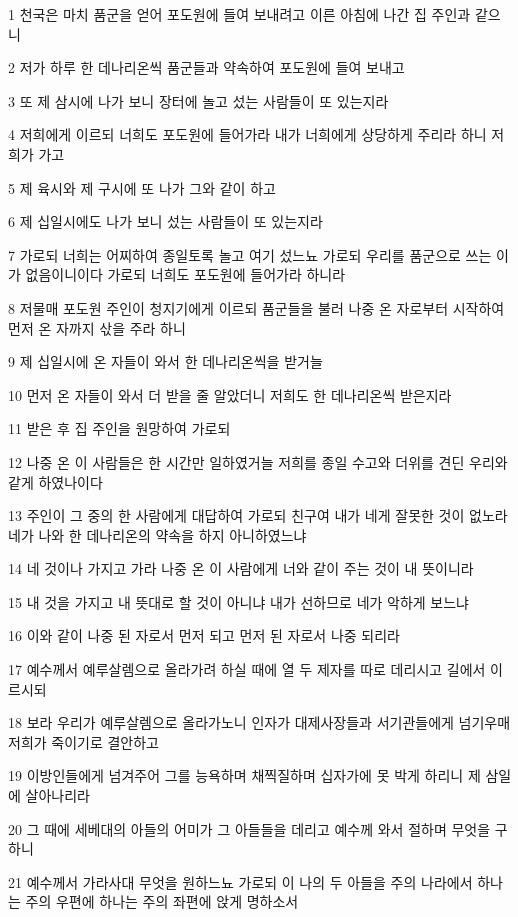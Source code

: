 \par 1 천국은 마치 품군을 얻어 포도원에 들여 보내려고 이른 아침에 나간 집 주인과 같으니
\par 2 저가 하루 한 데나리온씩 품군들과 약속하여 포도원에 들여 보내고
\par 3 또 제 삼시에 나가 보니 장터에 놀고 섰는 사람들이 또 있는지라
\par 4 저희에게 이르되 너희도 포도원에 들어가라 내가 너희에게 상당하게 주리라 하니 저희가 가고
\par 5 제 육시와 제 구시에 또 나가 그와 같이 하고
\par 6 제 십일시에도 나가 보니 섰는 사람들이 또 있는지라
\par 7 가로되 너희는 어찌하여 종일토록 놀고 여기 섰느뇨 가로되 우리를 품군으로 쓰는 이가 없음이니이다 가로되 너희도 포도원에 들어가라 하니라
\par 8 저물매 포도원 주인이 청지기에게 이르되 품군들을 불러 나중 온 자로부터 시작하여 먼저 온 자까지 삯을 주라 하니
\par 9 제 십일시에 온 자들이 와서 한 데나리온씩을 받거늘
\par 10 먼저 온 자들이 와서 더 받을 줄 알았더니 저희도 한 데나리온씩 받은지라
\par 11 받은 후 집 주인을 원망하여 가로되
\par 12 나중 온 이 사람들은 한 시간만 일하였거늘 저희를 종일 수고와 더위를 견딘 우리와 같게 하였나이다
\par 13 주인이 그 중의 한 사람에게 대답하여 가로되 친구여 내가 네게 잘못한 것이 없노라 네가 나와 한 데나리온의 약속을 하지 아니하였느냐
\par 14 네 것이나 가지고 가라 나중 온 이 사람에게 너와 같이 주는 것이 내 뜻이니라
\par 15 내 것을 가지고 내 뜻대로 할 것이 아니냐 내가 선하므로 네가 악하게 보느냐
\par 16 이와 같이 나중 된 자로서 먼저 되고 먼저 된 자로서 나중 되리라
\par 17 예수께서 예루살렘으로 올라가려 하실 때에 열 두 제자를 따로 데리시고 길에서 이르시되
\par 18 보라 우리가 예루살렘으로 올라가노니 인자가 대제사장들과 서기관들에게 넘기우매 저희가 죽이기로 결안하고
\par 19 이방인들에게 넘겨주어 그를 능욕하며 채찍질하며 십자가에 못 박게 하리니 제 삼일에 살아나리라
\par 20 그 때에 세베대의 아들의 어미가 그 아들들을 데리고 예수께 와서 절하며 무엇을 구하니
\par 21 예수께서 가라사대 무엇을 원하느뇨 가로되 이 나의 두 아들을 주의 나라에서 하나는 주의 우편에 하나는 주의 좌편에 앉게 명하소서
